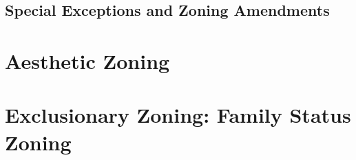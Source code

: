 \begin{questions}

\end{questions}


\subsection{Special Exceptions and Zoning Amendments}




\section{Aesthetic Zoning}








\begin{questions}

\end{questions}


\section{Exclusionary Zoning: Family Status Zoning}






\begin{questions}

\end{questions}

